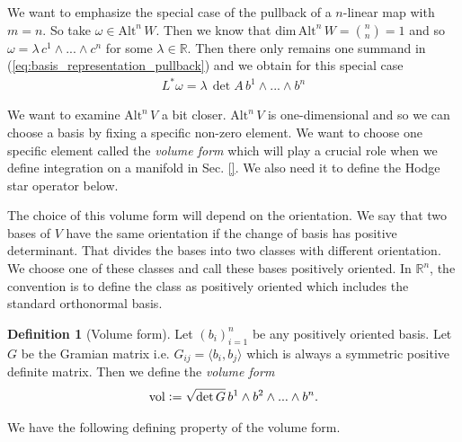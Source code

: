 \documentclass[12pt,a4paper]{article}
\numberwithin{equation}{subsection}
\numberwithin{lemma}{subsection}
\theoremstyle{definition}
\newtheorem{definition}[lemma]{Definition}
\DeclareMathOperator{\vol}{vol}
\newcommand{\alternating}[2]{ {\text{Alt}^{#1}\,#2} }
\newcommand{\real}{\mathbb{R}}
\begin{document}
We want to emphasize the special case of the pullback of a $n$-linear map 
with $m = n$. So take $\omega \in \alternating{n}{W}$. Then we know that 
dim$\,\alternating{n}{W} = {n\choose n} = 1$ and so
$\omega = \lambda\, c^1 \wedge ... \wedge c^n$ for some $\lambda \in \real$. 
Then there only remains one summand in (\ref{eq:basis_representation_pullback}) 
and we obtain for this special case
\begin{align}
    L^* \omega = \lambda \, \det A \, b^1 \wedge ... \wedge b^n
    \label{eq:pullback_alternating_nlinear_map}
\end{align}

We want to examine $\alternating{n}{V}$ a bit closer. 
$\alternating{n}{V}$ is one-dimensional and so we can choose a basis by fixing 
a specific non-zero element. We want to choose one specific element 
called the \textit{volume form} which will play a crucial role 
when we define integration on a manifold in Sec. \ref{}. We also need it to 
define the Hodge star operator below.

The choice of this volume form will depend on the orientation. 
We say that two bases of $V$ 
have the same orientation if the change of basis has positive determinant. 
That divides the bases into two classes with different orientation.
We choose one of these classes and call these bases positively
oriented. In $\real^n$, the convention is to define the class as 
positively oriented which includes the standard orthonormal basis.

\begin{definition}[Volume form]
    Let $(b_i )_{i=1}^n$ be any positively oriented
    basis. Let $G$ be the Gramian matrix i.e. $G_{ij} = \langle b_i, b_j \rangle$ 
    which is always a symmetric positive definite matrix.
    Then we define the \textit{volume form}
    \begin{align*}
        \vol \vcentcolon= \sqrt{\det G} \, b^1 \wedge b^2 \wedge ... \wedge b^n.
    \end{align*}
\end{definition}

We have the following defining property of the volume form.
\end{document}
